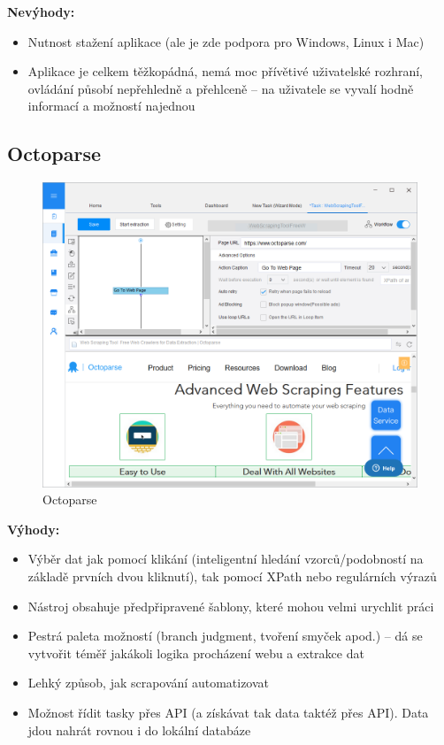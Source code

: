 \documentclass[thesis=B,czech]{FITthesis}[2012/06/26]
\begin{document}
\textbf{Nevýhody:}
\begin{itemize}
	\item Nutnost stažení aplikace (ale je zde podpora pro Windows, Linux i Mac)
	\item Aplikace je celkem těžkopádná, nemá moc přívětivé uživatelské rozhraní, ovládání působí nepřehledně a přehlceně -- na uživatele se vyvalí hodně informací a možností najednou
\end{itemize}


\newpage
\subsection{Octoparse}
\begin{figure}[h]
	\includegraphics[width=\linewidth]{images/Octoparse.png}
	\caption{Octoparse}
	\label{fig:octoparse}
\end{figure}

\textbf{Výhody:}
\begin{itemize}
	\item Výběr dat jak pomocí klikání (inteligentní hledání vzorců/podobností na základě prvních dvou kliknutí), tak pomocí XPath nebo regulárních výrazů
	\item Nástroj obsahuje předpřipravené šablony, které mohou velmi urychlit práci
	\item Pestrá paleta možností (branch judgment, tvoření smyček apod.) -- dá se vytvořit téměř jakákoli logika procházení webu a extrakce dat
	\item Lehký způsob, jak scrapování automatizovat
	\item Možnost řídit tasky přes API (a získávat tak data taktéž přes API). Data jdou nahrát rovnou i do lokální databáze\\\\
\end{itemize}
\end{document}

